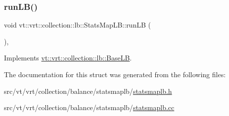 \subsubsection{\texorpdfstring{run\+L\+B()}{runLB()}}
{\footnotesize\ttfamily void vt\+::vrt\+::collection\+::lb\+::\+Stats\+Map\+L\+B\+::run\+LB (\begin{DoxyParamCaption}{ }\end{DoxyParamCaption})\hspace{0.3cm}{\ttfamily [override]}, {\ttfamily [virtual]}}



Implements \hyperlink{structvt_1_1vrt_1_1collection_1_1lb_1_1_base_l_b_a69a398c54f8129f365171a1189ffcd84}{vt\+::vrt\+::collection\+::lb\+::\+Base\+LB}.



The documentation for this struct was generated from the following files\+:\begin{DoxyCompactItemize}
\item 
src/vt/vrt/collection/balance/statsmaplb/\hyperlink{statsmaplb_8h}{statsmaplb.\+h}\item 
src/vt/vrt/collection/balance/statsmaplb/\hyperlink{statsmaplb_8cc}{statsmaplb.\+cc}\end{DoxyCompactItemize}
